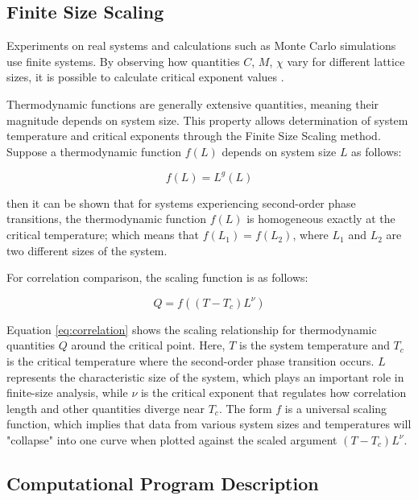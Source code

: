 \subsection{Finite Size Scaling}

Experiments on real systems and calculations such as Monte Carlo simulations use finite systems. By observing how quantities $C$, $M$, $\chi$ vary for different lattice sizes, it is possible to calculate critical exponent values \cite{Cardy1996}.

Thermodynamic functions are generally extensive quantities, meaning their magnitude depends on system size. This property allows determination of system temperature and critical exponents through the Finite Size Scaling method. Suppose a thermodynamic function $f(L)$ depends on system size $L$ as follows:

\begin{equation}
f(L) = L^g(L)
\label{eq:scaling}
\end{equation}

then it can be shown that for systems experiencing second-order phase transitions, the thermodynamic function $f(L)$ is homogeneous exactly at the critical temperature; which means that $f(L_1) = f(L_2)$, where $L_1$ and $L_2$ are two different sizes of the system.

For correlation comparison, the scaling function is as follows:

\begin{equation}
Q = f((T - T_c)L^\nu)
\label{eq:correlation}
\end{equation}

Equation \ref{eq:correlation} shows the scaling relationship for thermodynamic quantities $Q$ around the critical point. Here, $T$ is the system temperature and $T_c$ is the critical temperature where the second-order phase transition occurs. $L$ represents the characteristic size of the system, which plays an important role in finite-size analysis, while $\nu$ is the critical exponent that regulates how correlation length and other quantities diverge near $T_c$. The form $f$ is a universal scaling function, which implies that data from various system sizes and temperatures will "collapse" into one curve when plotted against the scaled argument $(T - T_c)L^\nu$.

\subsection{Computational Program Description}

